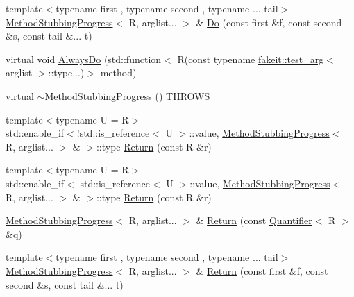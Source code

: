 \begin{DoxyCompactItemize}
\item 
{\footnotesize template$<$typename first , typename second , typename ... tail$>$ }\\\mbox{\hyperlink{structfakeit_1_1MethodStubbingProgress}{Method\+Stubbing\+Progress}}$<$ R, arglist... $>$ \& \mbox{\hyperlink{structfakeit_1_1MethodStubbingProgress_a157561400e37da65c5b48f4466fc603c}{Do}} (const first \&f, const second \&s, const tail \&... t)
\item 
virtual void \mbox{\hyperlink{structfakeit_1_1MethodStubbingProgress_a47464ab35cb06c00dbd00a13328b80a7}{Always\+Do}} (std\+::function$<$ R(const typename \mbox{\hyperlink{structfakeit_1_1test__arg}{fakeit\+::test\+\_\+arg}}$<$ arglist $>$\+::type...)$>$ method)
\item 
virtual \mbox{\hyperlink{structfakeit_1_1MethodStubbingProgress_aed2c96ce537706935976943354c49616}{$\sim$\+Method\+Stubbing\+Progress}} () T\+H\+R\+O\+WS
\item 
{\footnotesize template$<$typename U  = R$>$ }\\std\+::enable\+\_\+if$<$!std\+::is\+\_\+reference$<$ U $>$\+::value, \mbox{\hyperlink{structfakeit_1_1MethodStubbingProgress}{Method\+Stubbing\+Progress}}$<$ R, arglist... $>$ \& $>$\+::type \mbox{\hyperlink{structfakeit_1_1MethodStubbingProgress_ab97be63c322887db40cb788d28875fea}{Return}} (const R \&r)
\item 
{\footnotesize template$<$typename U  = R$>$ }\\std\+::enable\+\_\+if$<$ std\+::is\+\_\+reference$<$ U $>$\+::value, \mbox{\hyperlink{structfakeit_1_1MethodStubbingProgress}{Method\+Stubbing\+Progress}}$<$ R, arglist... $>$ \& $>$\+::type \mbox{\hyperlink{structfakeit_1_1MethodStubbingProgress_ab20141c6f552c3aa3399660c520c2ba4}{Return}} (const R \&r)
\item 
\mbox{\hyperlink{structfakeit_1_1MethodStubbingProgress}{Method\+Stubbing\+Progress}}$<$ R, arglist... $>$ \& \mbox{\hyperlink{structfakeit_1_1MethodStubbingProgress_acb4d4db8208a8eaadff77e7cbf3775db}{Return}} (const \mbox{\hyperlink{structfakeit_1_1Quantifier}{Quantifier}}$<$ R $>$ \&q)
\item 
{\footnotesize template$<$typename first , typename second , typename ... tail$>$ }\\\mbox{\hyperlink{structfakeit_1_1MethodStubbingProgress}{Method\+Stubbing\+Progress}}$<$ R, arglist... $>$ \& \mbox{\hyperlink{structfakeit_1_1MethodStubbingProgress_ae8417ec5f29f70be1ae914755b05e4db}{Return}} (const first \&f, const second \&s, const tail \&... t)
\item 

\end{DoxyCompactItemize}
